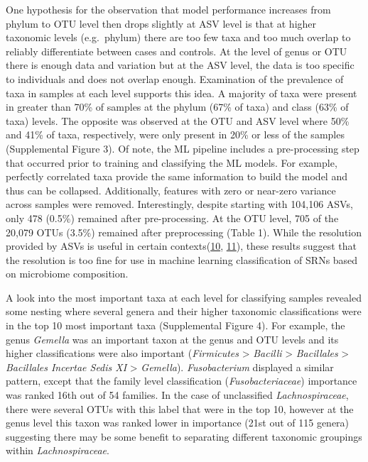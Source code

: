 \documentclass[
]{article}
\begin{document}
One hypothesis for the observation that model performance increases from
phylum to OTU level then drops slightly at ASV level is that at higher
taxonomic levels (e.g.~phylum) there are too few taxa and too much
overlap to reliably differentiate between cases and controls. At the
level of genus or OTU there is enough data and variation but at the ASV
level, the data is too specific to individuals and does not overlap
enough. Examination of the prevalence of taxa in samples at each level
supports this idea. A majority of taxa were present in greater than 70\%
of samples at the phylum (67\% of taxa) and class (63\% of taxa) levels.
The opposite was observed at the OTU and ASV level where 50\% and 41\%
of taxa, respectively, were only present in 20\% or less of the samples
(Supplemental Figure 3). Of note, the ML pipeline includes a
pre-processing step that occurred prior to training and classifying the
ML models. For example, perfectly correlated taxa provide the same
information to build the model and thus can be collapsed. Additionally,
features with zero or near-zero variance across samples were removed.
Interestingly, despite starting with 104,106 ASVs, only 478 (0.5\%)
remained after pre-processing. At the OTU level, 705 of the 20,079 OTUs
(3.5\%) remained after preprocessing (Table 1). While the resolution
provided by ASVs is useful in certain
contexts(\protect\hyperlink{ref-eren2013}{10},
\protect\hyperlink{ref-eren2015}{11}), these results suggest that the
resolution is too fine for use in machine learning classification of
SRNs based on microbiome composition.

A look into the most important taxa at each level for classifying
samples revealed some nesting where several genera and their higher
taxonomic classifications were in the top 10 most important taxa
(Supplemental Figure 4). For example, the genus \emph{Gemella} was an
important taxon at the genus and OTU levels and its higher
classifications were also important (\emph{Firmicutes} \textgreater{}
\emph{Bacilli} \textgreater{} \emph{Bacillales} \textgreater{}
\emph{Bacillales Incertae Sedis XI} \textgreater{} \emph{Gemella}).
\emph{Fusobacterium} displayed a similar pattern, except that the family
level classification (\emph{Fusobacteriaceae}) importance was ranked
16th out of 54 families. In the case of unclassified
\emph{Lachnospiraceae}, there were several OTUs with this label that
were in the top 10, however at the genus level this taxon was ranked
lower in importance (21st out of 115 genera) suggesting there may be
some benefit to separating different taxonomic groupings within
\emph{Lachnospiraceae}.
\end{document}
